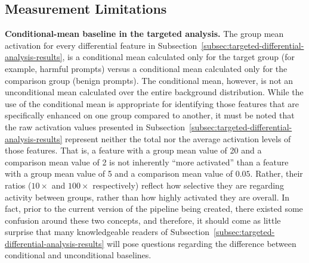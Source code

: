 \subsection{Measurement Limitations}
\label{subsubsec:measurement-limitations}

\textbf{Conditional-mean baseline in the targeted analysis.} The group mean activation for every differential feature in Subsection~\ref{subsec:targeted-differential-analysis-results}, is a conditional mean calculated only for the target group (for example, harmful prompts) versus a conditional mean calculated only for the comparison group (benign prompts). The conditional mean, however, is not an unconditional mean calculated over the entire background distribution. While the use of the conditional mean is appropriate for identifying those features that are specifically enhanced on one group compared to another, it must be noted that the raw activation values presented in Subsection~\ref{subsec:targeted-differential-analysis-results} represent neither the total nor the average activation levels of those features. That is, a feature with a group mean value of 20 and a comparison mean value of 2 is not inherently ``more activated'' than a feature with a group mean value of 5 and a comparison mean value of $0.05$. Rather, their ratios ($10\times$ and $100\times$ respectively) reflect how selective they are regarding activity between groups, rather than how highly activated they are overall. In fact, prior to the current version of the pipeline being created, there existed some confusion around these two concepts, and therefore, it should come as little surprise that many knowledgeable readers of Subsection~\ref{subsec:targeted-differential-analysis-results} will pose questions regarding the difference between conditional and unconditional baselines.

